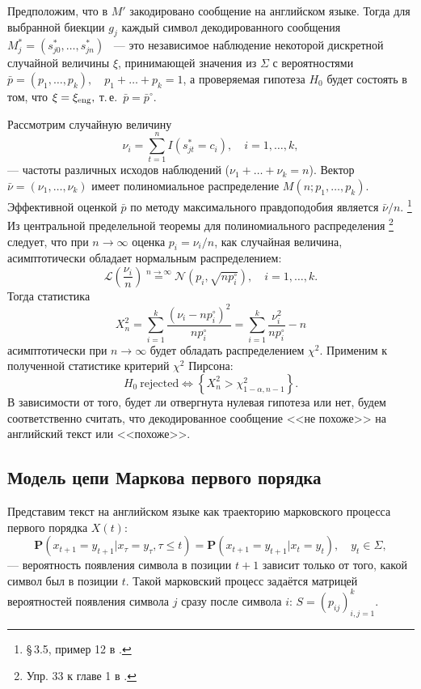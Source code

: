 \documentclass[a4paper,10pt]{article}
\begin{document}
Предположим, что в $M'$ закодировано сообщение на английском языке.
Тогда для выбранной биекции $g_j$ каждый символ декодированного сообщения 
$M_j^{*} = (s_{j0}^{*}, \ldots, s_{jn}^{*})$%
~--- это независимое наблюдение некоторой дискретной случайной 
величины $\xi$, принимающей значения из $\Sigma$
с вероятностями $\bar{p} = (p_1, \ldots, p_k), \quad p_1 + \ldots + p_k = 1$,
а проверяемая гипотеза $H_0$ будет состоять в том, что $\xi = \xi_{\rm eng},$
т.\,е.~$\bar{p} = \bar{p}^{\circ}.$

Рассмотрим случайную величину
$$\nu_i = \sum\limits_{t=1}^{n} I(s_{jt}^{*} = c_i), \quad i=1,\ldots,k,$$
--- частоты различных исходов наблюдений ($\nu_1+\ldots+\nu_k=n$).
Вектор $\bar{\nu} = (\nu_1, \ldots, \nu_k)$ 
имеет полиномиальное распределение $M(n; p_1, \ldots, p_k).$
Эффективной оценкой $\bar{p}$ по методу
максимального правдоподобия является $\bar{\nu} / n$.%
\footnote{\S\,3.5, пример 12 в \cite{ivchmed2010matstat}.}
Из центральной пределельной теоремы для полиномиального распределения%
\footnote{Упр. 33 к главе 1 в \cite{ivchmed2010matstat}.}
следует, что при $n \rightarrow \infty$ оценка 
$p_i = \nu_i / n$, как случайная величина,
асимптотически обладает нормальным распределением:
$$\mathcal{L}\left(\frac{\nu_i}{n}\right) 
    \stackrel{n \rightarrow \infty}{=} \mathcal{N}(p_i, \sqrt{np_i^\circ}), \quad i=1,\ldots,k.$$
Тогда статистика
$$X_n^2 = \sum\limits_{i=1}^{k} \frac{(\nu_i - np_i^\circ)^2}{np_i^\circ} = 
  \sum\limits_{i=1}^{k} \frac{\nu_i^2}{np_i^\circ} - n$$
асимптотически при $n \rightarrow \infty$ будет обладать распределением $\chi^2.$
Применим к полученной статистике критерий $\chi^2$ Пирсона:
$$H_0\ \mathrm{rejected} \Leftrightarrow 
    \left \{ X_n^2 > \chi_{1-\alpha,n-1}^2 \right \}.$$
В зависимости от того, будет ли отвергнута нулевая гипотеза или нет, будем 
соответственно считать, что декодированное сообщение <<не похоже>> на английский
текст или <<похоже>>.

\subsection{Модель цепи Маркова первого порядка}
Представим текст на английском языке как траекторию марковского процесса 
первого порядка $X(t)$:
$$\mathbf{P}(x_{t + 1} = y_{t+1} | x_{\tau} = y_\tau, \tau \leqslant t) =
  \mathbf{P}(x_{t + 1} = y_{t+1} | x_t = y_t), 
    \quad y_t \in \Sigma,$$
--- вероятность появления символа в позиции $t+1$ зависит только от того, 
какой символ был в позиции $t$.
Такой марковский процесс задаётся матрицей вероятностей появления символа $j$ 
сразу после символа $i$: $S = (p_{ij})_{i, j = 1}^k.$
\end{document}
